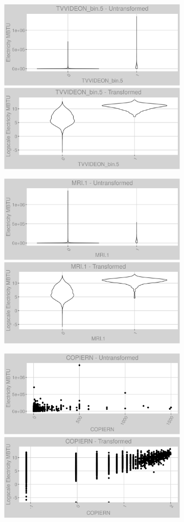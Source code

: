 \newpage
\begin{figure}
\centering
\begin{subfigure}{1\textwidth}
\centering
\includegraphics[width=.49\textwidth, height=0.3\textheight]{Images/electricity_var_original_3.png}
\includegraphics[width=.49\textwidth, height=0.3\textheight]{Images/electricity_var_transformed_3.png}
\end{subfigure}
\begin{subfigure}{1\textwidth}
\centering
\includegraphics[width=.49\textwidth, height=0.3\textheight]{Images/electricity_var_original_4.png}
\includegraphics[width=.49\textwidth, height=0.3\textheight]{Images/electricity_var_transformed_4.png}
\end{subfigure}
\begin{subfigure}{1\textwidth}
\centering
\includegraphics[width=.49\textwidth, height=0.3\textheight]{Images/electricity_var_original_5.png}
\includegraphics[width=.49\textwidth, height=0.3\textheight]{Images/electricity_var_transformed_5.png}
\end{subfigure}
\end{figure}
